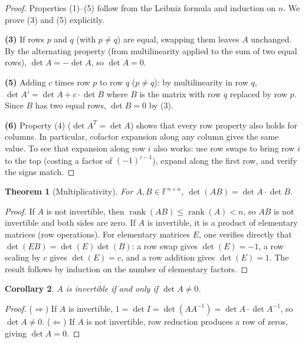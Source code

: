 \documentclass[11pt,a4paper]{article}
\theoremstyle{definition}
\theoremstyle{plain}
\newtheorem{theorem}{Theorem}[section]
\newtheorem{corollary}[theorem]{Corollary}
\theoremstyle{remark}
\newcommand{\F}{\mathbb{F}}
\DeclareMathOperator{\rank}{rank}
\begin{document}
\begin{proof}
Properties (1)--(5) follow from the Leibniz formula and induction on $n$. We prove
(3) and (5) explicitly.

\textbf{(3)} If rows $p$ and $q$ (with $p \neq q$) are equal, swapping them leaves $A$
unchanged. By the alternating property (from multilinearity applied to the sum of two
equal rows), $\det A = -\det A$, so $\det A = 0$.

\textbf{(5)} Adding $c$ times row $p$ to row $q$ ($p \neq q$): by multilinearity in row $q$,
$\det A' = \det A + c \cdot \det B$ where $B$ is the matrix with row $q$ replaced by row $p$.
Since $B$ has two equal rows, $\det B = 0$ by (3).

\textbf{(6)} Property (4) ($\det A^T = \det A$) shows that every row property also holds
for columns. In particular, cofactor expansion along any column gives the same value.
To see that expansion along row $i$ also works: use row swaps to bring row $i$ to the
top (costing a factor of $(-1)^{i-1}$), expand along the first row, and verify the
signs match.
\end{proof}

\begin{theorem}[Multiplicativity]
\label{thm:det_multiplicativity}
For $A, B \in \F^{n \times n}$, $\det(AB) = \det A \cdot \det B$.
\end{theorem}

\begin{proof}
If $A$ is not invertible, then $\rank(AB) \leq \rank(A) < n$, so $AB$ is not invertible and
both sides are zero. If $A$ is invertible, it is a product of elementary matrices (row operations).
For elementary matrices $E$, one verifies directly that $\det(EB) = \det(E) \det(B)$: a row
swap gives $\det(E) = -1$, a row scaling by $c$ gives $\det(E) = c$, and a row addition gives
$\det(E) = 1$. The result follows by induction on the number of elementary factors.
\end{proof}

\begin{corollary}
\label{cor:det_invertibility}
$A$ is invertible if and only if $\det A \neq 0$.
\end{corollary}

\begin{proof}
($\Rightarrow$) If $A$ is invertible, $1 = \det I = \det(A A^{-1}) = \det A \cdot \det A^{-1}$,
so $\det A \neq 0$.
($\Leftarrow$) If $A$ is not invertible, row reduction produces a row of zeros, giving $\det A = 0$.
\end{proof}
\end{document}
